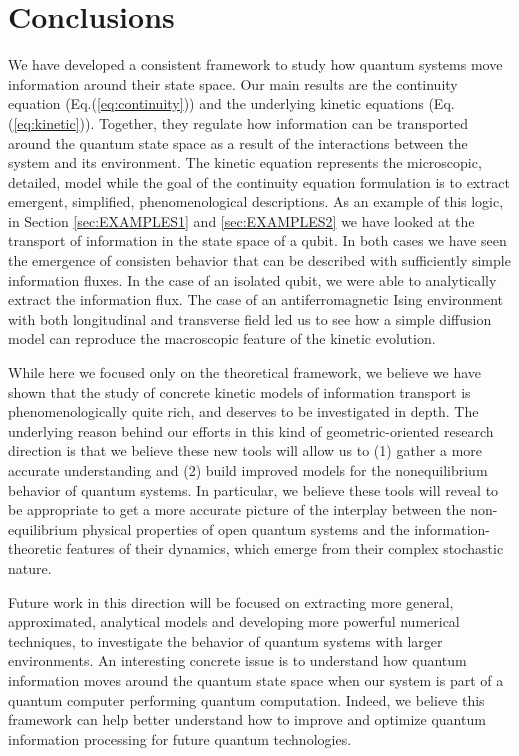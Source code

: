 \documentclass[draft,nofootinbib,pre,twocolumn,showpacs,showkeys,preprintnumbers,floatfix]{revtex4-1}
\newcommand{\1}{\mathbbm{1}}
\begin{document}
\section{Conclusions}
\label{sec:FINAL}

We have developed a consistent framework to study how quantum systems move
information around their state space. Our main results are the continuity equation (Eq.(\ref{eq:continuity}))
and the underlying kinetic equations (Eq.(\ref{eq:kinetic})). Together, they regulate how information
can be transported around the quantum state space as a result of the interactions between the
system and its environment. The kinetic equation represents the microscopic, detailed, model 
while the goal of the continuity equation formulation is to extract emergent, simplified, phenomenological descriptions. 
As an example of this logic, in Section \ref{sec:EXAMPLES1} and \ref{sec:EXAMPLES2} 
we have looked at the transport of information in the state space of a qubit. In both cases we have 
seen the emergence of consisten behavior that can be described with sufficiently simple information 
fluxes. In the case of an isolated qubit, we were able to analytically extract the information flux. The 
case of an antiferromagnetic Ising environment with both longitudinal and transverse field led us to 
see how a simple diffusion model can reproduce the macroscopic feature of the kinetic evolution.

While here we focused only on the theoretical framework, we believe we have shown that the 
study of concrete kinetic models of information transport is phenomenologically quite rich, and
deserves to be investigated in depth. The underlying reason behind our efforts in this kind of geometric-oriented 
research direction is that we believe these new tools will allow us to (1) gather a more accurate understanding
and (2) build improved models for the nonequilibrium behavior of quantum systems. In particular, we
believe these tools will reveal to be appropriate to get a more accurate picture of the interplay between 
the non-equilibrium physical properties of open quantum systems and the information-theoretic features
of their dynamics, which emerge from their complex stochastic nature.



Future work in this direction will be focused on extracting more general, approximated, analytical models and 
developing more powerful numerical techniques, to investigate the behavior of quantum systems with larger 
environments. An interesting concrete issue is to understand how quantum information moves around the 
quantum state space when our system is part of a quantum computer performing quantum computation.
Indeed, we believe this framework can help better understand how to improve and optimize quantum information
processing for future quantum technologies.
\end{document}
